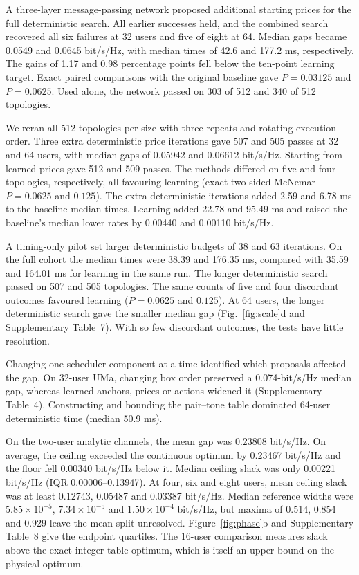 A three-layer message-passing network proposed additional starting prices for the full deterministic search. All earlier successes held, and the combined search recovered all six failures at 32 users and five of eight at 64. Median gaps became 0.0549 and 0.0645 bit/s/Hz, with median times of 42.6 and 177.2 ms, respectively. The gains of 1.17 and 0.98 percentage points fell below the ten-point learning target. Exact paired comparisons with the original baseline gave \(P=0.03125\) and \(P=0.0625\). Used alone, the network passed on 303 of 512 and 340 of 512 topologies.

We reran all 512 topologies per size with three repeats and rotating execution order. Three extra deterministic price iterations gave 507 and 505 passes at 32 and 64 users, with median gaps of 0.05942 and 0.06612 bit/s/Hz. Starting from learned prices gave 512 and 509 passes. The methods differed on five and four topologies, respectively, all favouring learning (exact two-sided McNemar \(P=0.0625\) and \(0.125\)). The extra deterministic iterations added 2.59 and 6.78 ms to the baseline median times. Learning added 22.78 and 95.49 ms and raised the baseline's median lower rates by 0.00440 and 0.00110 bit/s/Hz.


A timing-only pilot set larger deterministic budgets of 38 and 63 iterations. On the full cohort the median times were 38.39 and 176.35 ms, compared with 35.59 and 164.01 ms for learning in the same run. The longer deterministic search passed on 507 and 505 topologies. The same counts of five and four discordant outcomes favoured learning (\(P=0.0625\) and \(0.125\)). At 64 users, the longer deterministic search gave the smaller median gap (Fig.~\ref{fig:scale}d and Supplementary Table~7). With so few discordant outcomes, the tests have little resolution.


Changing one scheduler component at a time identified which proposals affected the gap. On 32-user UMa, changing box order preserved a 0.074-bit/s/Hz median gap, whereas learned anchors, prices or actions widened it (Supplementary Table~4). Constructing and bounding the pair--tone table dominated 64-user deterministic time (median 50.9 ms).

On the two-user analytic channels, the mean gap was 0.23808 bit/s/Hz. On average, the ceiling exceeded the continuous optimum by 0.23467 bit/s/Hz and the floor fell 0.00340 bit/s/Hz below it. Median ceiling slack was only 0.00221 bit/s/Hz (IQR 0.00006--0.13947). At four, six and eight users, mean ceiling slack was at least 0.12743, 0.05487 and 0.03387 bit/s/Hz. Median reference widths were \(5.85\times10^{-5}\), \(7.34\times10^{-5}\) and \(1.50\times10^{-4}\) bit/s/Hz, but maxima of 0.514, 0.854 and 0.929 leave the mean split unresolved. Figure~\ref{fig:phase}b and Supplementary Table~8 give the endpoint quartiles. The 16-user comparison measures slack above the exact integer-table optimum, which is itself an upper bound on the physical optimum.


